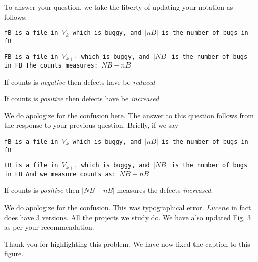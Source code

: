 \noindent To answer your question, we take the liberty of updating your notation as follows:
\be
  \item \tt{fB} is a file in $V_k$ which is buggy, and $|nB|$ is the number of bugs in \tt{fB}
  \item \tt{FB} is a file in $V_{k+1}$ which is buggy, and $|NB|$ is the number of bugs in \tt{FB}
\ee  
The counts measures: $NB - nB$
\bi
  \item If counts is \textit{negative} then defects have be \textit{reduced}
  \item If counts is \textit{positive} then defects have be \textit{increased}
\ei  


We do apologize for the confusion here. The answer to this question follows from the response to your previous question. Briefly, if we say
\be
  \item \tt{fB} is a file in $V_k$ which is buggy, and $|nB|$ is the number of bugs in \tt{fB}
  \item \tt{FB} is a file in $V_{k+1}$ which is buggy, and $|NB|$ is the number of bugs in \tt{FB}
\ee  
And we measure counts as: $NB - nB$
\bi
  \item If counts is \textit{positive} then $|NB - nB|$ measures the defects \textit{increased}.
\ei  



We do apologize for the confusion. This was typographical error. $\mathit{Lucene}$ in fact does have 3 versions. All the projects we study do. We have also updated Fig. 3 as per your recommendation.  


Thank you for highlighting this problem. We have now fixed the caption to this figure. 